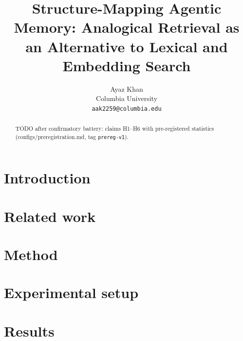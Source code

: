 \documentclass{article}
\title{Structure-Mapping Agentic Memory: Analogical Retrieval as an
Alternative to Lexical and Embedding Search}
\author{%
  Ayaz Khan\\
  Columbia University\\
  \texttt{aak2259@columbia.edu}\\
}
\begin{document}
\maketitle

\begin{abstract}
  TODO after confirmatory battery: claims H1--H6 with pre-registered
  statistics (configs/preregistration.md, tag \texttt{prereg-v1}).
\end{abstract}

\section{Introduction}

\section{Related work}

\section{Method}

\section{Experimental setup}

\section{Results}
\end{document}
